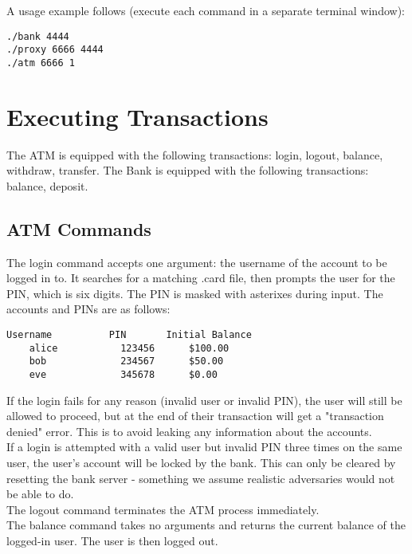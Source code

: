 \documentclass[10pt,a4paper]{article}
\begin{document}
A usage example follows (execute each command in a separate terminal window):\\

\begin{lstlisting}
./bank 4444
./proxy 6666 4444
./atm 6666 1
\end{lstlisting}

\section{Executing Transactions}

The ATM is equipped with the following transactions: login, logout, balance, withdraw, transfer. The Bank is equipped with the following transactions: balance, deposit.

\subsection{ATM Commands}

The login command accepts one argument: the username of the account to be logged in to. It searches for a matching .card file, then prompts the user for the PIN, which is six digits. The PIN is masked with asterixes during input. The accounts and PINs are as follows:\\

\begin{lstlisting}
Username		  PIN		Initial Balance
	alice			123456		$100.00
	bob				234567		$50.00
	eve				345678		$0.00
\end{lstlisting}

If the login fails for any reason (invalid user or invalid PIN), the user will still be allowed to proceed, but at the end of their transaction will get a "transaction denied" error. This is to avoid leaking any information about the accounts.\\

If a login is attempted with a valid user but invalid PIN three times on the same user, the user's account will be locked by the bank. This can only be cleared by resetting the bank server - something we assume realistic adversaries would not be able to do.\\

The logout command terminates the ATM process immediately.\\

The balance command takes no arguments and returns the current balance of the logged-in user. The user is then logged out.\\
\end{document}
